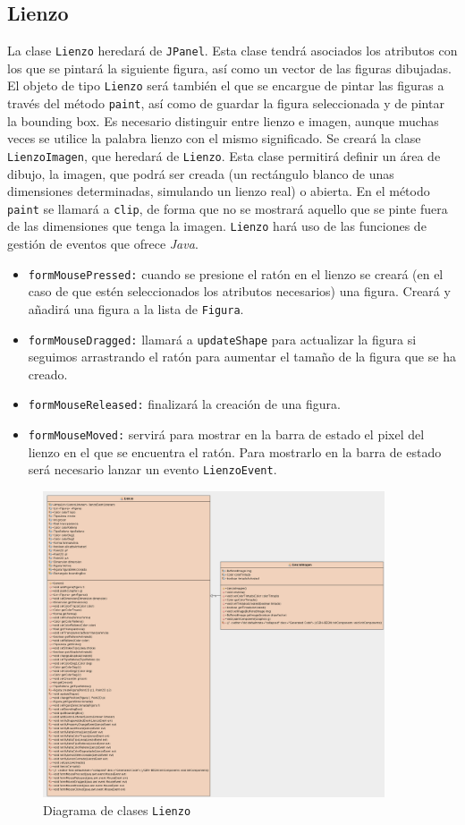 \subsection{Lienzo}
La clase \texttt{Lienzo} heredará de \texttt{JPanel}. Esta clase tendrá asociados los atributos con los que se pintará la siguiente figura, así como un vector de las figuras dibujadas. El objeto de tipo \texttt{Lienzo} será también el que se encargue de pintar las figuras a través del método \texttt{paint}, así como de guardar la figura seleccionada y de pintar la bounding box.  
\vskip0.3cm
Es necesario distinguir entre lienzo e imagen, aunque muchas veces se utilice la palabra lienzo con el mismo significado. Se creará la clase \texttt{LienzoImagen}, que heredará de \texttt{Lienzo}. Esta clase permitirá definir un área de dibujo, la imagen, que podrá ser creada (un rectángulo blanco de unas dimensiones determinadas, simulando un lienzo real) o abierta. En el método \texttt{paint} se llamará a \texttt{clip}, de forma que no se mostrará aquello que se pinte fuera de las dimensiones que tenga la imagen.
\vskip0.3cm
\texttt{Lienzo} hará uso de las funciones de gestión de eventos que ofrece \textit{Java}.
\begin{itemize}
\item{\texttt{formMousePressed:} cuando se presione el ratón en el lienzo se creará (en el caso de que estén seleccionados los atributos necesarios) una figura. Creará y añadirá una figura a la lista de \texttt{Figura}.}
\item{\texttt{formMouseDragged:} llamará a \texttt{updateShape} para actualizar la figura si seguimos arrastrando el ratón para aumentar el tamaño de la figura que se ha creado.}
\item{\texttt{formMouseReleased:} finalizará la creación de una figura.}
\item{\texttt{formMouseMoved:} servirá para mostrar en la barra de estado el pixel del lienzo en el que se encuentra el ratón. Para mostrarlo en la barra de estado será necesario lanzar un evento \texttt{LienzoEvent}.}
\end{itemize}
\begin{figure}
 \centering
  \includegraphics[width=0.9\textwidth]{diagramas/lienzo.png}
 \caption{Diagrama de clases \texttt{Lienzo}}
 \label{diseño}
 \end{figure}
